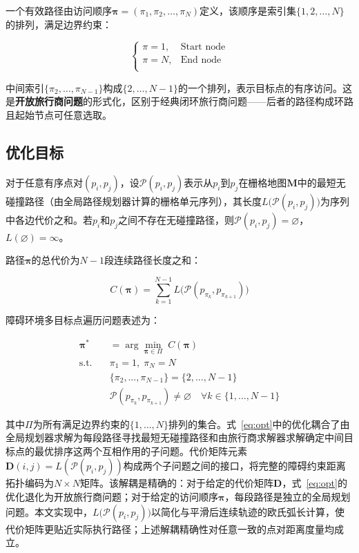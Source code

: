 \documentclass[lettersize,journal]{IEEEtran}
\begin{document}
一个有效路径由访问顺序$\bm{\pi} = (\pi_1, \pi_2, \dots, \pi_N)$定义，该顺序是索引集$\{1, 2, \dots, N\}$的排列，满足边界约束：

\begin{equation}
\begin{cases}
\pi = 1, & \text{Start node} \\
\pi = N, & \text{End node} \\
\end{cases}
\label{eq:boundary}
\end{equation}

中间索引$\{\pi_2, \dots, \pi_{N-1}\}$构成$\{2, \dots, N-1\}$的一个排列，表示目标点的有序访问。这是\textbf{开放旅行商问题}的形式化，区别于经典闭环旅行商问题——后者的路径构成环路且起始节点可任意选取\textcolor{blue}{\cite{ref4,ref36}}。

\subsection{优化目标}

对于任意有序点对$(p_i, p_j)$，设$\mathcal{P}(p_i, p_j)$表示从$p_i$到$p_j$在栅格地图$\mathbf{M}$中的最短无碰撞路径（由全局路径规划器计算的栅格单元序列），其长度$L\big(\mathcal{P}(p_i, p_j)\big)$为序列中各边代价之和。若$p_i$和$p_j$之间不存在无碰撞路径，则$\mathcal{P}(p_i, p_j) = \varnothing$，$L(\varnothing) = \infty$。

路径$\bm{\pi}$的总代价为$N-1$段连续路径长度之和：

\begin{equation}
C(\bm{\pi}) = \sum_{k=1}^{N-1} L\big(\mathcal{P}(p_{\pi_k}, p_{\pi_{k+1}})\big)
\label{eq:totalcost}
\end{equation}

障碍环境多目标点遍历问题表述为：

\begin{align}
\bm{\pi}^{*} &= \arg\min_{\bm{\pi} \in \Pi} \; C(\bm{\pi})
\label{eq:opt}\\
\text{s.t.} \quad &\pi_1 = 1,\; \pi_N = N \nonumber\\
&\{\pi_2, \dots, \pi_{N-1}\} = \{2, \dots, N-1\} \nonumber\\
&\mathcal{P}(p_{\pi_k}, p_{\pi_{k+1}}) \neq \varnothing \quad \forall k \in \{1, \dots, N-1\} \nonumber
\end{align}

其中$\Pi$为所有满足边界约束的$\{1, \dots, N\}$排列的集合。式~\textcolor{blue}{\eqref{eq:opt}}中的优化耦合了由全局规划器求解为每段路径寻找最短无碰撞路径和由旅行商求解器求解确定中间目标点的最优排序这两个互相作用的子问题。代价矩阵元素$\mathbf{D}(i, j) = L(\mathcal{P}(p_i, p_j))$构成两个子问题之间的接口，将完整的障碍约束距离拓扑编码为$N \times N$矩阵。该解耦是精确的：对于给定的代价矩阵$\mathbf{D}$，式~\textcolor{blue}{\eqref{eq:opt}}的优化退化为开放旅行商问题；对于给定的访问顺序$\bm{\pi}$，每段路径是独立的全局规划问题。本文实现中，$L\big(\mathcal{P}(p_i, p_j)\big)$以简化与平滑后连续轨迹的欧氏弧长计算，使代价矩阵更贴近实际执行路径；上述解耦精确性对任意一致的点对距离度量均成立。
\end{document}
